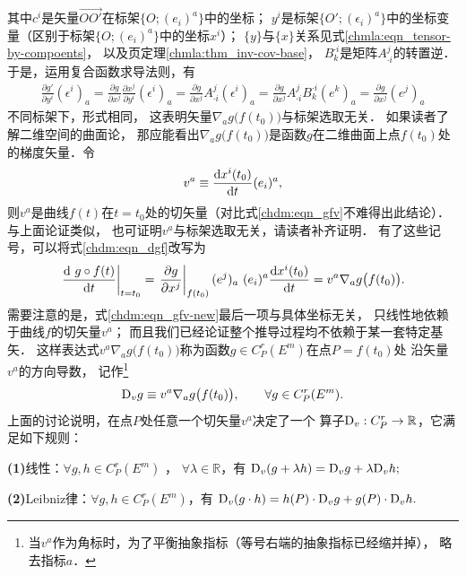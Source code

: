 其中$c^i$是矢量$\overrightarrow{OO'}$在标架$\{O;(e_i)^a\}$中的坐标；
$y^i$是标架$\{O';(\epsilon_i)^a\}$中的坐标变量（区别于标架$\{O;(e_i)^a\}$中的坐标$x^i$）；
$\{y\}$与$\{x\}$关系见式\eqref{chmla:eqn_tensor-by-compoents}，
以及\pageref{chmla:thm_inv-cov-base}页定理\ref{chmla:thm_inv-cov-base}，
$B^{\cdot i}_k$是矩阵$A^j_{\cdot i}$的转置逆．
于是，运用复合函数求导法则，有
\begin{align}
    \frac{\partial g'}{\partial y^i}(\epsilon^i)_a = 
    \frac{\partial g}{\partial x^j}\frac{\partial x^j}{\partial y^i} (\epsilon^i)_a = 
    \frac{\partial g}{\partial x^j}A^j_{\cdot i} (\epsilon^i)_a = 
    \frac{\partial g}{\partial x^j}A^j_{\cdot i} B^{\cdot i}_k (e^k)_a
    =\frac{\partial g}{\partial x^j} (e^j)_a  \label{chdm:eqn_gpgeA}
\end{align}
不同标架下，形式相同，
这表明矢量$\nabla_a g\bigl(f(t_0)\bigr)$与标架选取无关．
如果读者了解二维空间的曲面论，
那应能看出$\nabla_a g\bigl(f(t_0)\bigr)$是函数$g$在二维曲面上点$f(t_0)$处的梯度矢量．令
\begin{equation} \label{chdm:eqn_vectmp}
    v^a \equiv \frac{{\rm d} x^i(t_0)}{{\rm d}t} (e_i)^a,
\end{equation}
则$v^a$是曲线$f(t)$在$t=t_0$处的切矢量（对比式\eqref{chdm:eqn_gfv}不难得出此结论）．
与上面论证类似，
也可证明$v^a$与标架选取无关，请读者补齐证明．
有了这些记号，可以将式\eqref{chdm:eqn_dgf}改写为
\begin{equation}\label{chdm:eqn_gfv-new}
    \left.\frac{{\rm d}\ g\circ f(t)}{{\rm d}t}\right| _{t=t_0} 
    =\left.\frac{\partial g}{\partial x^j}\right| _{f(t_0)} (e^j)_a
      \ (e_i)^a \frac{{\rm d} x^i(t_0)}{{\rm d}t} 
    =v^a \nabla_a g\bigl(f(t_0)\bigr) .
\end{equation}
需要注意的是，式\eqref{chdm:eqn_gfv-new}最后一项与具体坐标无关，
只线性地依赖于曲线$f$的切矢量$v^a$；
而且我们已经论证整个推导过程均不依赖于某一套特定基矢．
这样表达式$v^a \nabla_a g\bigl(f(t_0)\bigr)$称为函数$g\in C^r_P(E^m)$在点$P=f(t_0)$处
沿矢量$v^a$的{\heiti 方向导数}，
记作{\footnote{当$v^a$作为角标时，为了平衡抽象指标（等号右端的抽象指标已经缩并掉），
        略去指标$a$．}}
\begin{equation}\label{chdm:eqn_vec-in-EV}
    {\rm D}_v g \equiv v^a \nabla_a g\bigl(f(t_0)\bigr), \qquad
    \forall g\in C^r_P(E^m).
\end{equation}
上面的讨论说明，在点$P$处任意一个切矢量$v^a$决定了一个
算子${\rm D}_v:C^r_P \to \mathbb{R}$，它满足如下规则：
\begin{definition}\label{chdm:def_tang-vec-inEV}
    {\bfseries (1)}线性：$\forall g,h \in C^r_P(E^m) $ ， $\forall \lambda \in \mathbb{R}$，有
    ${\rm D}_v (g+\lambda h) = {\rm D}_v g+ \lambda {\rm D}_v h ;$
    
    
    {\bfseries (2)}Leibniz律：$\forall g,h \in C^r_P(E^m) $，有
    ${\rm D}_v (g\cdot h) = h(P)\cdot {\rm D}_v g+ g(P)\cdot {\rm D}_v h .$
\end{definition}


